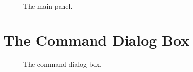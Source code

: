 \documentclass[11pt]{article}
\begin{document}
\begin{figure}[t]

\centerline{}

\caption{
  The main panel.
}
\label{mainPanelFig}
\end{figure}


\section{The Command Dialog Box}

\begin{figure}

\centerline{\epsfxsize=5.5in }

\caption{
  The command dialog box.
}
\label{commandDialogBoxFig}
\end{figure}
\end{document}
